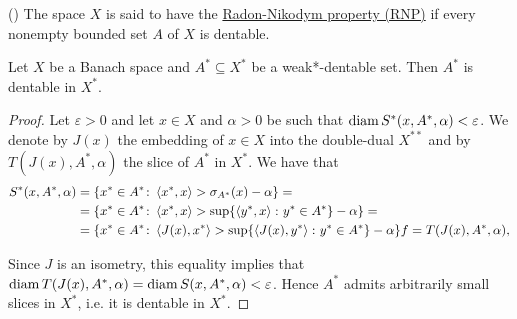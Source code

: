 \begin{definition}(\cite[definition 5.2]{Phelps1993})
  \label{def:radon-nikodym-property}
  The space $X$ is said to have the \uline{Radon-Nikodym property (RNP)} if every nonempty bounded set $A$ of $X$ is dentable.
\end{definition}

\begin{proposition}
  \label{thm:weak_dentable_sets_are_dentable}
  Let $X$ be a Banach space and $A^* \subseteq X^*$ be a weak*-dentable set. Then $A^*$ is dentable in $X^*$.
\end{proposition}
\begin{proof}
  Let $\varepsilon > 0$ and let $x \in X$ and $\alpha > 0$ be such that $\operatorname{diam} S^*(x, A^*, \alpha) < \varepsilon$.
  We denote by $J(x)$ the embedding of $x \in X$ into the double-dual $X^{**}$ and by $T(J(x), A^*, \alpha)$ the slice of $A^*$ in $X^*$. We have that
  \begin{align*}
    S^*(x, A^*, \alpha)
    &=
    \{ x^* \in A^* \colon \left\langle x^*, x \right\rangle > \sigma_{A^*}(x) - \alpha \}
    = \\ &=
    \{ x^* \in A^* \colon \left\langle x^*, x \right\rangle > \sup \{ \left\langle y^*, x \right\rangle \colon y^* \in A^* \} - \alpha \}
    = \\ &=
    \{ x^* \in A^* \colon \left\langle J(x), x^* \right\rangle > \sup \{ \left\langle J(x), y^* \right\rangle \colon y^* \in A^* \} - \alpha \}f
    =
    T(J(x), A^*, \alpha),
  \end{align*}

  Since $J$ is an isometry, this equality implies that $\operatorname{diam} T(J(x), A^*, \alpha) = \operatorname{diam} S(x, A^*, \alpha) < \varepsilon$. Hence $A^*$ admits arbitrarily small slices in $X^*$, i.e. it is dentable in $X^*$.
\end{proof}
